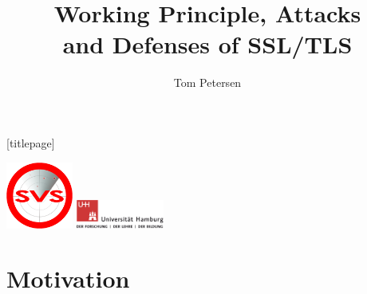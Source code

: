 


\title{Working Principle, Attacks\\ and Defenses of SSL/TLS}
\author[Tom Petersen]{Tom Petersen}
\date{}%



\begingroup
	[titlepage]
	\begin{frame}[plain]
		\vskip8mm
		\includegraphics[width=2.2cm]{pic/svs_logo_hires-ohne-was.png}
		 \vskip-20mm %
		\titlepage
		\vspace{\fill}
		\includegraphics[width=2.9cm]{pic/UHH-Logo_2010_Farbe_RGB_hires_nomargin.png}
		\vskip20pt
	\end{frame}
\endgroup


\section{Motivation}

